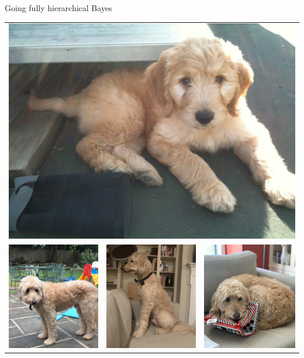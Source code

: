 \documentclass[notes,11pt, aspectratio=169]{beamer}
\begin{document}
\begin{frame}{Going fully hierarchical Bayes}
\begin{center}
\begin{tabular}{ccc}
  \multicolumn{3}{c}{\includegraphics[width=0.3\linewidth]{images/bayes1.JPG}}\\
  \includegraphics[width=0.24\linewidth]{images/bayes2.JPG} & \includegraphics[width=0.24\linewidth]{images/bayes3.JPG} & \includegraphics[width=0.24\linewidth]{images/bayes4.JPG}\\
\end{tabular}
\end{center}
\end{frame}
\end{document}
